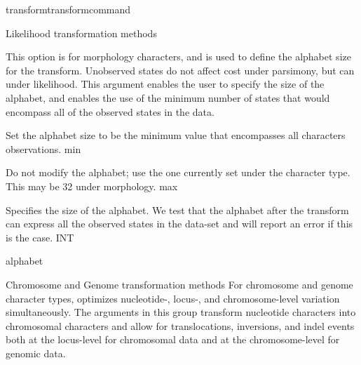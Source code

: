 \begin{command}{transform}{transformcommand}
\begin{arguments}
\begin{argumentgroup}{Likelihood transformation methods}
                    {This option is for morphology characters, and is used to
                    define the alphabet size for the transform. Unobserved 
                    states do not affect cost under parsimony, but can under likelihood. 
                    This argument enables the user to specify the size of the alphabet, 
                    and enables the use of the minimum number of states that would 
                    encompass all of the observed states in the data.

                    \begin{description}

                            {Set the alphabet size to be the minimum value that
                            encompasses all characters observations.}
                            {min}

                            {Do not modify the alphabet; use the one currently
                            set under the character type. This may be 32 under
                            morphology.}
                            {max}

                            {Specifies the size of the alphabet. We test that
                            the alphabet after the transform can express all the
                            observed states in the data-set and will report an
                            error if this is the case.}
                            {INT}
                            
                    \end{description}}
                {alphabet}

        \end{argumentgroup}

        \begin{argumentgroup}{Chromosome and Genome transformation methods}
            For chromosome and genome character types, \poy optimizes nucleotide-, 
            locus-, and chromosome-level variation simultaneously. The arguments in this group
            transform nucleotide characters into chromosomal characters and allow for 
            translocations, inversions, and indel events both at the locus-level for chromosomal data 
            and at the chromosome-level for genomic data.
           

\end{argumentgroup}
\end{arguments}
\end{command}
